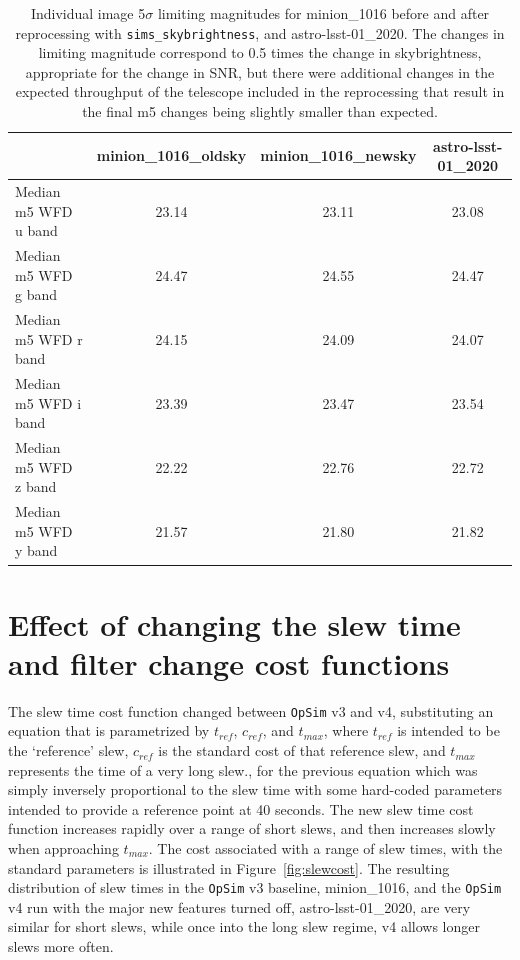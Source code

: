 \documentclass[DM,lsstdraft,authoryear,toc]{lsstdoc}
\newcommand{\opsim}{\texttt{OpSim}\xspace}
\newcommand{\simsky}{\texttt{sims\_skybrightness}\xspace}
\begin{document}
\begin{table}[ht]
\caption{Individual image 5$\sigma$ limiting magnitudes for minion\_1016 before and after reprocessing with \simsky, and astro-lsst-01\_2020. The changes in limiting magnitude correspond to 0.5 times the change in skybrightness, appropriate for the change in SNR, but there were additional changes in the expected throughput of the telescope included in the reprocessing that result in the final m5 changes being slightly smaller than expected.}
\begin{center}
\begin{tabular}{lccc}
\toprule
{} &  minion\_1016\_oldsky &  minion\_1016\_newsky &  astro-lsst-01\_2020 \\
\midrule
Median m5 WFD u band &               23.14 &               23.11 &               23.08 \\
Median m5 WFD g band &               24.47 &               24.55 &               24.47 \\
Median m5 WFD r band &               24.15 &               24.09 &               24.07 \\
Median m5 WFD i band &               23.39 &               23.47 &               23.54 \\
Median m5 WFD z band &               22.22 &               22.76 &               22.72 \\
Median m5 WFD y band &               21.57 &               21.80 &               21.82 \\
\bottomrule
\end{tabular}
\end{center}
\label{tab:m5depth}
\end{table}

\section{Effect of changing the slew time and filter change cost functions}

The slew time cost function changed between \opsim v3 and v4, substituting an equation that is parametrized by $t_{ref}$, $c_{ref}$, and $t_{max}$, where $t_{ref}$ is intended to be the `reference' slew, $c_{ref}$ is the standard cost of that reference slew, and $t_{max}$ represents the time of a very long slew., for the previous equation which was simply inversely proportional to the slew time with some hard-coded parameters intended to provide a reference point at 40 seconds. The new slew time cost function increases rapidly over a range of short slews, and then increases slowly when approaching $t_{max}$.  The cost associated with a range of slew times, with the standard parameters is illustrated in Figure~\ref{fig:slewcost}.  The resulting distribution of slew times in the \opsim v3 baseline, minion\_1016, and the \opsim v4 run with the major new features turned off, astro-lsst-01\_2020, are very similar for short slews, while once into the long slew regime, v4 allows longer slews more often.
\end{document}
